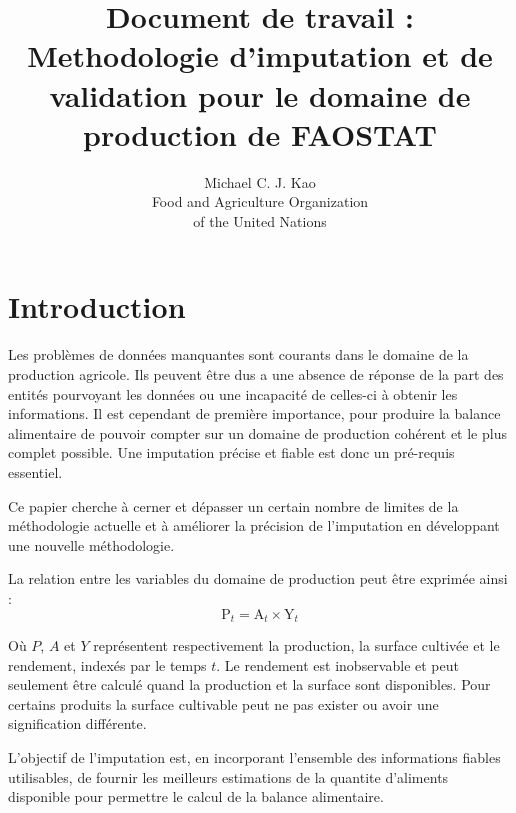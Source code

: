 \documentclass[nojss]{jss}\usepackage{graphicx, color}
\title{\bf Document de travail : Methodologie d'imputation et de
  validation pour le domaine de production de FAOSTAT}
\author{Michael C. J. Kao\\ Food and Agriculture Organization \\ of
  the United Nations}
\begin{document}

\section{Introduction}
Les probl\`{e}mes de donn\'{e}es manquantes sont courants dans le
domaine de la production agricole. Ils peuvent \^{e}tre dus a une
absence de r\'{e}ponse de la part des entit\'{e}s pourvoyant les
donn\'{e}es ou une incapacit\'{e} de celles-ci \`{a} obtenir les
informations.  Il est cependant de premi\`{e}re importance, pour
produire la balance alimentaire de pouvoir compter sur un domaine de
production coh\'{e}rent et le plus complet possible. Une imputation
pr\'{e}cise et fiable est donc un pr\'{e}-requis essentiel.

Ce papier cherche \`{a} cerner et d\'{e}passer un certain nombre de
limites de la m\'{e}thodologie actuelle et \`{a} am\'{e}liorer la
pr\'{e}cision de l'imputation en d\'{e}veloppant une nouvelle
m\'{e}thodologie.


La relation entre les variables du domaine de production peut \^{e}tre
exprim\'{e}e ainsi :
\begin{equation}
  \label{eq:identity}
  \text{P}_t = \text{A}_t \times \text{Y}_t
\end{equation}


O\`{u} $P$, $A$ et $Y$ repr\'{e}sentent respectivement la production, la
surface cultiv\'{e}e et le rendement, index\'{e}s par le temps $t$. Le
rendement est inobservable et peut seulement \^{e}tre calcul\'{e} quand la
production et la surface sont disponibles. Pour certains produits la
surface cultivable peut ne pas exister ou avoir une signification
diff\'{e}rente.

L'objectif de l'imputation est, en incorporant l'ensemble des
informations fiables utilisables, de fournir les meilleurs estimations
de la quantite d'aliments disponible pour permettre le calcul de la
balance alimentaire.
\end{document}

